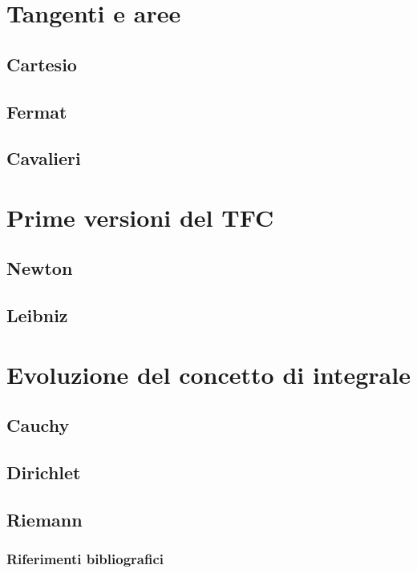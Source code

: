 \documentclass[8pt]{beamer}
\begin{document}
\section{Tangenti e aree}
\subsection{Cartesio}

\subsection{Fermat}


\subsection{Cavalieri}


\section{Prime versioni del TFC}
\subsection{Newton}

\subsection{Leibniz}


\section{Evoluzione del concetto di integrale}
\subsection{Cauchy}

\subsection{Dirichlet}

\subsection{Riemann}


\begin{frame} %

  \frametitle{Riferimenti bibliografici}
  
  \scriptsize{}
  
  
\end{frame}
\end{document}
